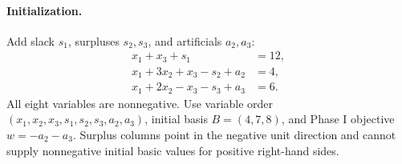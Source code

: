 \documentclass[11pt,a4paper]{article}
\begin{document}
\paragraph{Initialization.}
Add slack $s_1$, surpluses $s_2,s_3$, and artificials $a_2,a_3$:
\[
  \begin{aligned}
    x_1+x_3+s_1&=12,\\
    x_1+3x_2+x_3-s_2+a_2&=4,\\
    x_1+2x_2-x_3-s_3+a_3&=6.
  \end{aligned}
\]
All eight variables are nonnegative. Use variable order
$(x_1,x_2,x_3,s_1,s_2,s_3,a_2,a_3)$, initial basis $B=(4,7,8)$,
and Phase I objective $w=-a_2-a_3$.
Surplus columns point in the negative unit direction and cannot supply
nonnegative initial basic values for positive right-hand sides.
\end{document}
